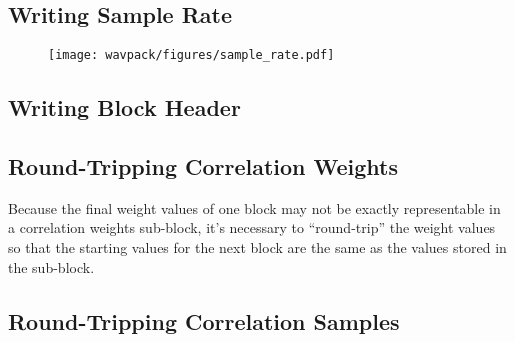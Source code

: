 \subsection{Writing Sample Rate}
\label{wavpack:write_sample_rate}
\begin{figure}[h]
  \texttt{[image: wavpack/figures/sample\_rate.pdf]}
\end{figure}

\clearpage

\subsection{Writing Block Header}
\label{wavpack:write_block_header}
{
  
}

\clearpage

\subsection{Round-Tripping Correlation Weights}
\label{wavpack:roundtrip_weights}
Because the final weight values of one block
may not be exactly representable in a correlation weights sub-block,
it's necessary to ``round-trip'' the weight values
so that the starting values for the next block
are the same as the values stored in the sub-block.



\clearpage

\subsection{Round-Tripping Correlation Samples}
\label{wavpack:roundtrip_samples}


